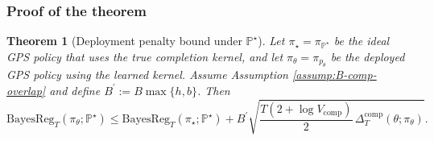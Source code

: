 \documentclass[11pt]{article}
\newtheorem*{theorem*}{Theorem}
\renewcommand{\P}{\mathbb{P}}
\providecommand{\BReg}{\mathrm{BayesReg}}
\begin{document}
\subsubsection{Proof of the theorem}
\label{app:thm2.4:main_proof}



\begin{theorem*}[Deployment penalty bound under $\P^\star$]
\label{thm:sec25_deploy_apx}
Let $\pi_\star=\pi_{\P^\star}$ be the ideal GPS policy that uses the true completion kernel, and
let $\pi_\theta=\pi_{p_\theta}$ be the deployed GPS policy using the learned kernel. Assume Assumption \ref{assump:B-comp-overlap} and define $B^\prime := B \max \{h, b\}$. Then
\begin{equation*}
\BReg_T(\pi_\theta;\P^\star)
\le
\BReg_T(\pi_\star;\P^\star)
+
B^\prime \sqrt{\frac{T(2+\log V_{\mathrm{comp}})}{2}\,\Delta^{\mathrm{comp}}_{T}(\theta;\pi_\theta)}.
\end{equation*}
\end{theorem*}
\end{document}
